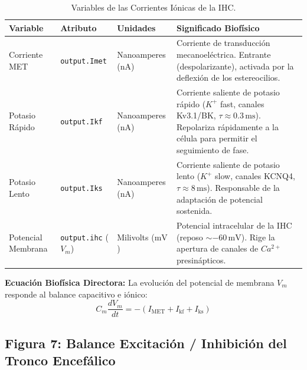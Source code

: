 \documentclass[12pt,a4paper]{article}
\begin{document}
\begin{table}[H]
\centering
\caption{Variables de las Corrientes Iónicas de la IHC.}
\begin{tabularx}{\textwidth}{>{\raggedright\arraybackslash}p{3.0cm} >{\raggedright\arraybackslash}p{3.4cm} >{\raggedright\arraybackslash}p{2.8cm} X}
\toprule
\textbf{Variable} & \textbf{Atributo} & \textbf{Unidades} & \textbf{Significado Biofísico} \\
\midrule
Corriente MET & \texttt{output.Imet} & Nanoamperes ($\text{nA}$) & Corriente de transducción mecanoeléctrica. Entrante (despolarizante), activada por la deflexión de los estereocilios. \\
Potasio Rápido & \texttt{output.Ikf} & Nanoamperes ($\text{nA}$) & Corriente saliente de potasio rápido ($K^+$ fast, canales Kv3.1/BK, $\tau \approx 0.3\,\text{ms}$). Repolariza rápidamente a la célula para permitir el seguimiento de fase. \\
Potasio Lento & \texttt{output.Iks} & Nanoamperes ($\text{nA}$) & Corriente saliente de potasio lento ($K^+$ slow, canales KCNQ4, $\tau \approx 8\,\text{ms}$). Responsable de la adaptación de potencial sostenida. \\
Potencial Membrana & \texttt{output.ihc} ($V_m$) & Milivolts ($\text{mV}$) & Potencial intracelular de la IHC (reposo $\sim -60\,\text{mV}$). Rige la apertura de canales de $Ca^{2+}$ presinápticos. \\
\bottomrule
\end{tabularx}
\end{table}

\textbf{Ecuación Biofísica Directora:} La evolución del potencial de membrana $V_m$ responde al balance capacitivo e iónico:
\begin{equation}
C_m \frac{dV_m}{dt} = - \left( I_{\text{MET}} + I_{\text{kf}} + I_{\text{ks}} \right)
\end{equation}

\subsection{Figura 7: Balance Excitación / Inhibición del Tronco Encefálico}
\end{document}

